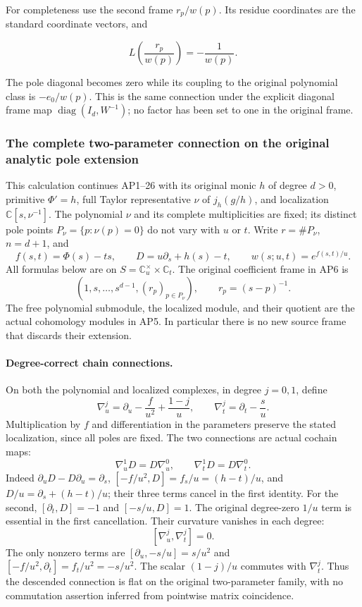 For completeness use the second frame \(r_p/w(p)\). Its residue coordinates are the standard coordinate vectors, and

\[
L\left(\frac{r_p}{w(p)}\right)=-\frac{1}{w(p)}.
\tag{AP13}
\]

The pole diagonal becomes zero while its coupling to the original polynomial class is \(-e_0/w(p)\). This is the same connection under the explicit diagonal frame map \(\operatorname{diag}(I_d,W^{-1})\); no factor has been set to one in the original frame.

\subsubsection{The complete two-parameter connection on the original analytic pole extension}
\label{sec:apu-original-connection}

This calculation continues AP1--26 with its original monic \(h\) of
degree \(d>0\), primitive \(\Phi'=h\), full Taylor representative
\(\nu\) of \(j_h(g/h)\), and localization
\(\mathbb C[s,\nu^{-1}]\).  The polynomial \(\nu\) and its complete
multiplicities are fixed; its distinct pole points
\(P_\nu=\{p:\nu(p)=0\}\) do not vary with \(u\) or \(t\).
Write \(r=\#P_\nu\), \(n=d+1\), and
\[
 f(s,t)=\Phi(s)-ts,\qquad
 D=u\partial_s+h(s)-t,\qquad
 w(s;u,t)=e^{f(s,t)/u}.
 \tag{APU1}
\]
All formulas below are on
\(S=\mathbb C^\times_u\times\mathbb C_t\).
The original coefficient frame in AP6 is
\[
 (1,s,\ldots,s^{d-1},(r_p)_{p\in P_\nu}),\qquad
 r_p=(s-p)^{-1}.
 \tag{APU2}
\]
The free polynomial submodule, the localized module, and their
quotient are the actual cohomology modules in AP5.  In particular
there is no new source frame that discards their extension.

\paragraph{Degree-correct chain connections.}
On both the polynomial and localized complexes, in degree \(j=0,1\),
define
\[
 \nabla_u^j=\partial_u-\frac{f}{u^2}+\frac{1-j}{u},
 \qquad
 \nabla_t^j=\partial_t-\frac{s}{u}.
 \tag{APU3}
\]
Multiplication by \(f\) and differentiation in the parameters preserve
the stated localization, since all poles are fixed.  The two
connections are actual cochain maps:
\[
 \nabla_u^1D=D\nabla_u^0,\qquad
 \nabla_t^1D=D\nabla_t^0 .
 \tag{APU4}
\]
Indeed \(\partial_u D-D\partial_u=\partial_s\),
\([{-f/u^2},D]=f_s/u=(h-t)/u\), and
\(D/u=\partial_s+(h-t)/u\); their three terms cancel in the first
identity.  For the second,
\([\partial_t,D]=-1\) and \([{-s/u},D]=1\).
The original degree-zero \(1/u\) term is essential in the first
cancellation.
Their curvature vanishes in each degree:
\[
 [\nabla_u^j,\nabla_t^j]=0.
 \tag{APU5}
\]
The only nonzero terms are
\([\partial_u,-s/u]=s/u^2\) and
\([-f/u^2,\partial_t]=f_t/u^2=-s/u^2\).
The scalar \((1-j)/u\) commutes with \(\nabla_t^j\).
Thus the descended connection is flat on the original
two-parameter family, with no commutation assertion inferred from
pointwise matrix coincidence.

